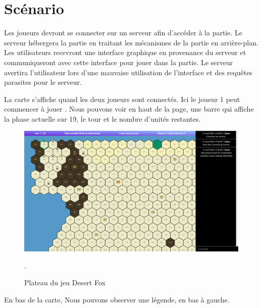 \section{Scénario}

Les joueurs devront se connecter sur un serveur afin d'accéder à la partie. Le serveur hébergera la partie en traitant les mécanismes de la partie en arrière-plan. Les utilisateurs recevront une interface graphique en provenance du serveur et communiqueront avec cette interface pour jouer dans la partie.
Le serveur avertira l'utilisateur lors d'une mauvaise utilisation de l'interface et des requêtes parasites pour le serveur.




La carte s'affiche quand les deux joueurs sont connectés. Ici le joueur 1 peut commencer à jouer
. Nous pouvons voir en haut de la page, une barre qui affiche la phase actuelle sur 19, le tour  et le nombre d'unités restantes.

\begin{figure}[H]
    \centering
    \includegraphics[scale=0.35]{data/plateau_du_jeu.png}
    \caption{Plateau du jeu Desert Fox}.
\end{figure}

En bas de la carte, Nous pouvons observer une légende, en bas à gauche.\\

